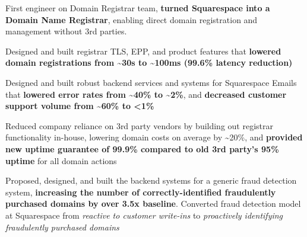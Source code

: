 \documentclass[]{two-column-resume}
\begin{document}
{\begin{minipage}[t]{0.65\textwidth}
        \begin{tightemize}
                            \item First engineer on Domain Registrar team, \textbf{turned Squarespace into a Domain Name Registrar}, enabling direct domain registration and management without 3rd parties.
                            \item Designed and built registrar TLS, EPP, and product features that \textbf{lowered domain registrations from \textasciitilde30s to \textasciitilde100ms (99.6\% latency reduction)}
                            \item Designed and built robust backend services and systems for Squarespace Emails that \textbf{lowered error rates from \textasciitilde40\% to \textasciitilde2\%}, and \textbf{decreased customer support volume from \textasciitilde60\% to <1\%}
                            \item Reduced company reliance on 3rd party vendors by building out registrar functionality in-house, lowering domain costs on average by \textasciitilde20\%, and \textbf{provided new uptime guarantee of 99.9\% compared to old 3rd party's 95\% uptime} for all domain actions
                            \item Proposed, designed, and built the backend systems for a generic fraud detection system, \textbf{increasing the number of correctly-identified fraudulently purchased domains by over 3.5x baseline}. Converted fraud detection model at Squarespace from \textit{reactive to customer write-ins} to \textit{proactively identifying fraudulently purchased domains}
                    \end{tightemize}
        \sectionsep
    





\end{minipage}}
\end{document}
